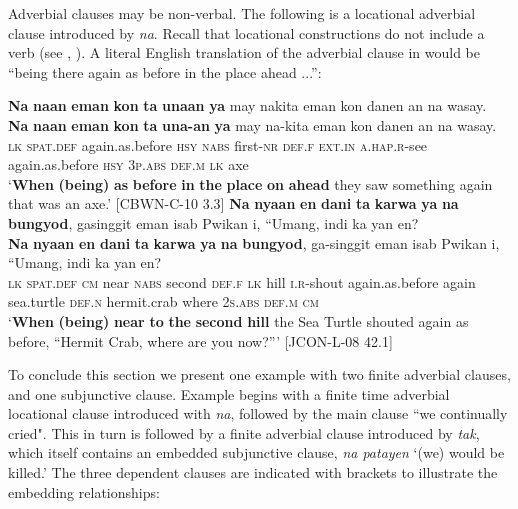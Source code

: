 Adverbial clauses may be non-verbal. The following is a locational adverbial clause introduced by \textit{na}. Recall that locational constructions do not include a verb (see , ). A literal English translation of the adverbial clause in  would be “being there again as before in the place ahead ...”:

\ea
\label{bkm:Ref474745770}
\textbf{Na}  \textbf{naan}  \textbf{eman}  \textbf{kon}  \textbf{ta}  \textbf{unaan}  \textbf{ya}  may  nakita eman  kon  danen  an  na  wasay. \smallskip\\
\gll \textbf{Na}  \textbf{naan}  \textbf{eman}  \textbf{kon}  \textbf{ta}  \textbf{una-an}  \textbf{ya}  may  na-kita eman  kon  danen  an  na  wasay. \\
\textsc{lk}  \textsc{spat.def}  again.as.before  \textsc{hsy}  \textsc{nabs}  first-\textsc{nr}  \textsc{def.f}  \textsc{ext.in}  \textsc{a.hap.r}-see
again.as.before  \textsc{hsy}  3\textsc{p.abs}  \textsc{def.m}  \textsc{lk}  axe \\
\glt `\textbf{When} \textbf{(being)} \textbf{as} \textbf{before} \textbf{in} \textbf{the} \textbf{place} \textbf{on} \textbf{ahead} they saw something again that was an axe.’ [CBWN-C-10 3.3]
\z
\ea
\textbf{Na}  \textbf{nyaan}  \textbf{en}  \textbf{dani}  \textbf{ta}  \textbf{karwa}  \textbf{ya}  \textbf{na}  \textbf{bungyod},  gasinggit eman  isab  Pwikan  i,  “Umang,  indi  ka  yan  en? \smallskip\\
\gll \textbf{Na}  \textbf{nyaan}  \textbf{en}  \textbf{dani}  \textbf{ta}  \textbf{karwa}  \textbf{ya}  \textbf{na}  \textbf{bungyod},  ga-singgit eman  isab  Pwikan  i,  “Umang,  indi  ka  yan  en? \\
\textsc{lk}  \textsc{spat.def}  \textsc{cm}  near  \textsc{nabs}  second  \textsc{def.f}  \textsc{lk}  hill  \textsc{i.r}-shout
again.as.before  again  sea.turtle  \textsc{def.n}  hermit.crab  where  2\textsc{s.abs}  \textsc{def.m}  \textsc{cm} \\
\glt `\textbf{When} \textbf{(being)} \textbf{near} \textbf{to} \textbf{the} \textbf{second} \textbf{hill} the Sea Turtle shouted again as before, “Hermit Crab, where are you now?”' [JCON-L-08 42.1]
\z

To conclude this section we present one example with two finite adverbial clauses, and one subjunctive clause. Example  begins with a finite time adverbial locational clause introduced with \textit{na}, followed by the main clause ``we continually cried". This in turn is followed by a finite adverbial clause introduced by \textit{tak}, which itself contains an embedded subjunctive clause, \textit{na patayen} ‘(we) would be killed.’ The three dependent clauses are indicated with brackets to illustrate the embedding relationships:

